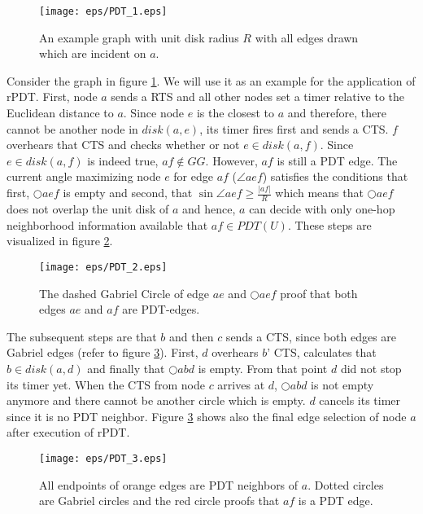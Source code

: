 \begin{figure}[h!]
\centering
\texttt{[image: eps/PDT\_1.eps]}
\caption{An example graph with unit disk radius $R $ with all edges drawn which are incident on $a $.}
\label{fig:PDT_1}
\end{figure}
Consider the graph in figure \ref{fig:PDT_1}.
We will use it as an example for the application of rPDT.
First, node $a $ sends a RTS and all other nodes set a timer relative to the Euclidean distance to $a $.
Since node $e $ is the closest to $a $ and therefore, there cannot be another node in $disk(a,e) $, its timer fires first and sends a CTS.
$f $ overhears that CTS and checks whether or not $e \in disk(a,f) $.
Since $e \in disk(a,f) $ is indeed true, $af \notin GG $.
However, $af $ is still a PDT edge.
The current angle maximizing node $e $ for edge $af $ ($\angle{aef} $) satisfies the conditions that first, $\bigcirc{aef} $ is empty and second, that $\sin{\angle{aef}} \geq\frac{|af|}{R} $ which means that $\bigcirc{aef} $ does not overlap the unit disk of $a $ and hence, $a $ can decide with only one-hop neighborhood information available that $af \in PDT(U)$.
These steps are visualized in figure \ref{fig:PDT_2}.
\begin{figure}[h!]
\centering
\texttt{[image: eps/PDT\_2.eps]}
\caption{The dashed Gabriel Circle of edge $ae $ and $\bigcirc{aef} $ proof that both edges $ae $ and $af $ are PDT-edges.}
\label{fig:PDT_2}
\end{figure}
The subsequent steps are that $b $ and then $c $ sends a CTS, since both edges are Gabriel edges (refer to figure \ref{fig:PDT_3}).
First, $d $ overhears $b $' CTS, calculates that $b \in disk(a,d) $ and finally that $\bigcirc{abd} $ is empty.
From that point $d $ did not stop its timer yet.
When the CTS from node $c $ arrives at $d $, $\bigcirc{abd} $ is not empty anymore and there cannot be another circle which is empty.
$d $ cancels its timer since it is no PDT neighbor.
Figure \ref{fig:PDT_3} shows also the final edge selection of node $a $ after execution of rPDT.
\begin{figure}[h!]
\centering
\texttt{[image: eps/PDT\_3.eps]}
\caption{All endpoints of orange edges are PDT neighbors of $a $. Dotted circles are Gabriel circles and the red circle proofs that $af $ is a PDT edge.}
\label{fig:PDT_3}
\end{figure}
